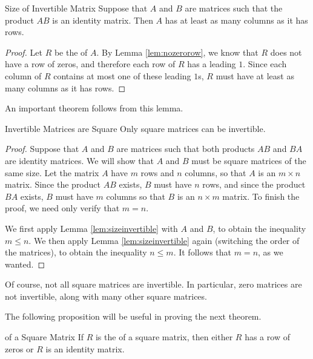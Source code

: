 \begin{lemma}{Size of Invertible Matrix}\label{lem:sizeinvertible}
Suppose that $A$ and $B$ are matrices such that the product $AB$ is an identity matrix. Then $A$ has at least as many columns as it has rows.
\end{lemma}
\ifdefined\showproofs
\begin{proof}
Let $R$ be the \rref \;of $A$. By Lemma \ref{lem:nozerorow}, we know that $R$ does not have a row of zeros, and therefore each row of $R$ has a leading $1$. Since each column of $R$ contains at most one of these leading $1$s, $R$ must have at least as many columns as it has rows.
\end{proof}
\fi

An important theorem follows from this lemma. 

\begin{theorem}{Invertible Matrices are Square}\label{thm:squareinvertible}
Only square matrices can be invertible.
\end{theorem}

\ifdefined\showproofs
\begin{proof}
Suppose that $A$ and $B$ are matrices such that both products $AB$ and $BA$ are identity matrices. We will show that $A$ and $B$ must be square matrices of the same size. Let the matrix $A$ have $m$ rows and $n$ columns, so that $A$ is an $m \times n$ matrix. Since the product $AB$ exists, $B$ must have $n$ rows, and since the product $BA$ exists, $B$ must have $m$ columns so that $B$ is an $n \times m$ matrix. To finish the proof, we need only verify that $m=n$. 

We first apply Lemma \ref{lem:sizeinvertible} with $A$ and $B$, to obtain the inequality $m \leq n$. We then apply Lemma \ref{lem:sizeinvertible} again (switching the order of the matrices), to obtain the inequality $n \leq m$. It follows that $m=n$, as we wanted.
\end{proof}
\fi

Of course, not all square matrices are invertible. In particular, zero matrices are not invertible, along with many other square matrices. 

The following proposition will be useful in proving the next theorem.

\begin{proposition}{\RREF of a Square Matrix}\label{prop:rrefsquare}
If $R$ is the \rref \;of a square matrix, then either $R$ has a row of zeros or $R$ is an identity matrix. 
\end{proposition}

